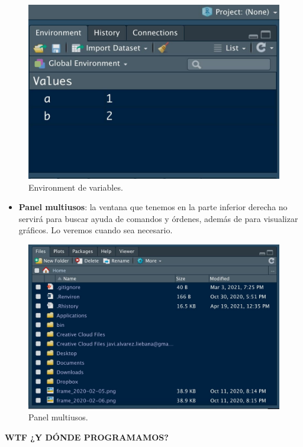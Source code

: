 \documentclass[11pt,]{book}
\providecommand{\tightlist}{%
  \setlength{\itemsep}{0pt}\setlength{\parskip}{0pt}}
\begin{document}
\begin{figure}

{\centering \includegraphics[width=0.75\linewidth]{./img/inicio_rstudio_3} 

}

\caption{Environment de variables.}\label{fig:inicio-rstudio-3}
\end{figure}

\begin{itemize}
\tightlist
\item
  \textbf{Panel multiusos}: la ventana que tenemos en la parte inferior derecha no servirá para buscar ayuda de comandos y órdenes, además de para visualizar gráficos. Lo veremos cuando sea necesario.
\end{itemize}

\begin{figure}

{\centering \includegraphics[width=0.75\linewidth]{./img/inicio_rstudio_4} 

}

\caption{Panel multiusos.}\label{fig:inicio-rstudio-4}
\end{figure}

\textbf{WTF ¿Y DÓNDE PROGRAMAMOS?}
\end{document}
